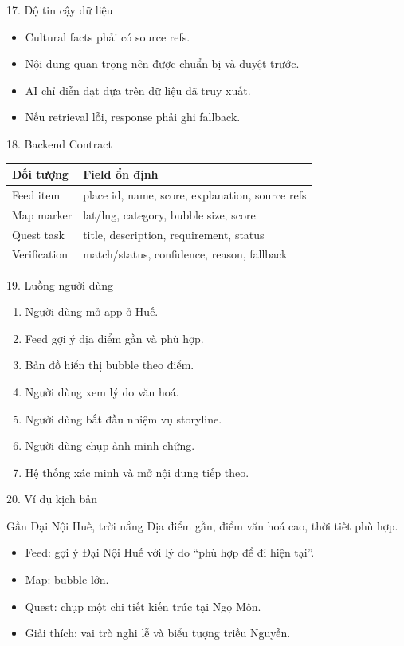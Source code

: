 \documentclass[aspectratio=169]{beamer}
\begin{document}
\begin{frame}{17. Độ tin cậy dữ liệu}
\begin{itemize}
    \item Cultural facts phải có source refs.
    \item Nội dung quan trọng nên được chuẩn bị và duyệt trước.
    \item AI chỉ diễn đạt dựa trên dữ liệu đã truy xuất.
    \item Nếu retrieval lỗi, response phải ghi fallback.
\end{itemize}
\end{frame}

\begin{frame}{18. Backend Contract}
\begin{tabularx}{\textwidth}{lX}
\toprule
\textbf{Đối tượng} & \textbf{Field ổn định}\\
\midrule
Feed item & place id, name, score, explanation, source refs\\
Map marker & lat/lng, category, bubble size, score\\
Quest task & title, description, requirement, status\\
Verification & match/status, confidence, reason, fallback\\
\bottomrule
\end{tabularx}
\end{frame}

\begin{frame}{19. Luồng người dùng}
\begin{enumerate}
    \item Người dùng mở app ở Huế.
    \item Feed gợi ý địa điểm gần và phù hợp.
    \item Bản đồ hiển thị bubble theo điểm.
    \item Người dùng xem lý do văn hoá.
    \item Người dùng bắt đầu nhiệm vụ storyline.
    \item Người dùng chụp ảnh minh chứng.
    \item Hệ thống xác minh và mở nội dung tiếp theo.
\end{enumerate}
\end{frame}

\begin{frame}{20. Ví dụ kịch bản}
\begin{block}{Gần Đại Nội Huế, trời nắng}
Địa điểm gần, điểm văn hoá cao, thời tiết phù hợp.
\end{block}
\begin{itemize}
    \item Feed: gợi ý Đại Nội Huế với lý do ``phù hợp để đi hiện tại''.
    \item Map: bubble lớn.
    \item Quest: chụp một chi tiết kiến trúc tại Ngọ Môn.
    \item Giải thích: vai trò nghi lễ và biểu tượng triều Nguyễn.
\end{itemize}
\end{frame}
\end{document}
